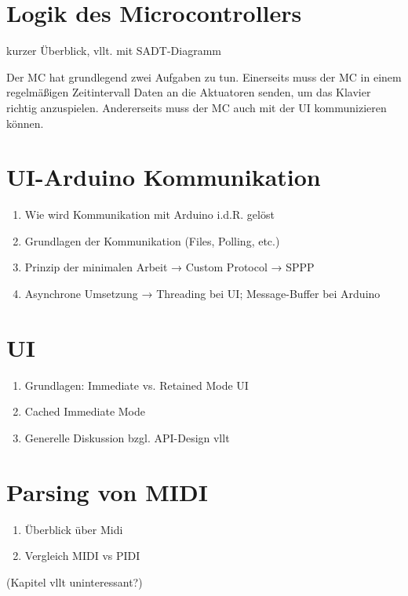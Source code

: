 \section{Logik des Microcontrollers} \label{vorgehenSW-MC}
kurzer Überblick, vllt. mit SADT-Diagramm

Der \ac{MC} hat grundlegend zwei Aufgaben zu tun. Einerseits muss der \ac{MC} in einem regelmäßigen Zeitintervall Daten an die Aktuatoren senden, um das Klavier richtig anzuspielen. Andererseits muss der \ac{MC} auch mit der \ac{UI} kommunizieren können.


\section{UI-Arduino Kommunikation} \label{vorgehenSW-SPPP}
\begin{enumerate}
    \item Wie wird Kommunikation mit Arduino i.d.R. gelöst
    \item Grundlagen der Kommunikation (Files, Polling, etc.)
    \item Prinzip der minimalen Arbeit → Custom Protocol → SPPP
    \item Asynchrone Umsetzung → Threading bei UI; Message-Buffer bei Arduino
\end{enumerate}

\section{UI} \label{vorgehenSW-UI}
\begin{enumerate}
    \item Grundlagen: Immediate vs. Retained Mode UI
    \item Cached Immediate Mode
    \item Generelle Diskussion bzgl. API-Design vllt
\end{enumerate}

\section{Parsing von MIDI} \label{vorgehenSW-MIDI}
\begin{enumerate}
    \item Überblick über Midi
    \item Vergleich MIDI vs PIDI
\end{enumerate}
(Kapitel vllt uninteressant?)